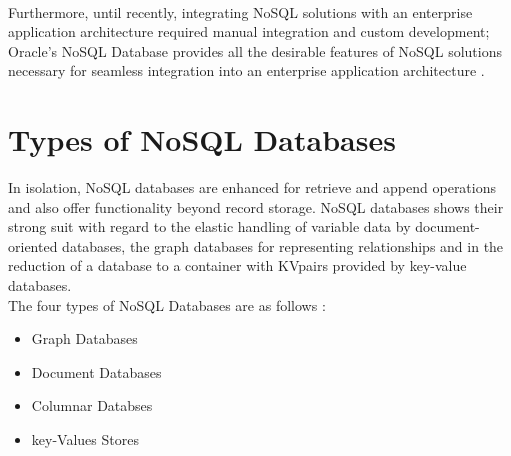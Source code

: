 \\
\hspace*{0.7in} Furthermore, until recently, integrating NoSQL solutions with an enterprise application architecture required manual integration and custom development; Oracle's NoSQL Database provides all the desirable features of NoSQL solutions necessary for seamless integration into an enterprise application architecture \cite{3}.

\section{Types of NoSQL Databases}
\hspace*{0.7in} In isolation, NoSQL databases are enhanced for retrieve and append operations and also offer functionality beyond record storage. NoSQL databases shows their strong suit with regard to the elastic handling of variable data by document-oriented databases, the graph databases for representing relationships and in the reduction of a database to a container with KVpairs provided by key-value databases. \\
The four types of NoSQL Databases are as follows :
\begin{itemize}
  \item Graph Databases
  \item Document Databases
  \item Columnar Databses
  \item key-Values Stores
\end{itemize}

